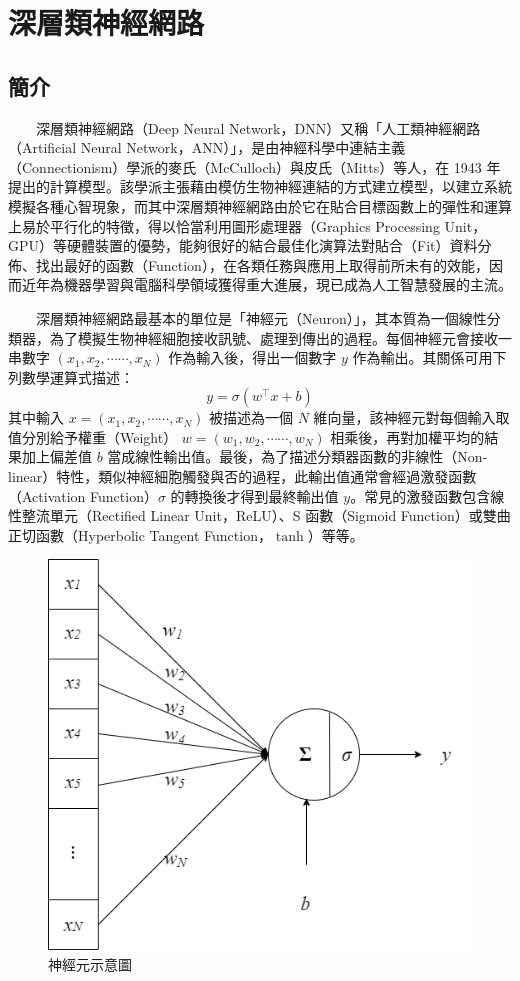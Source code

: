 \section{深層類神經網路}

\subsection{簡介}

　　深層類神經網路（Deep Neural Network，DNN）又稱「人工類神經網路（Artificial Neural Network，ANN）」，是由神經科學中連結主義（Connectionism）學派的麥氏（McCulloch）與皮氏（Mitts）等人，在 1943 年 \cite{mcculloch_logical_1943} 提出的計算模型。該學派主張藉由模仿生物神經連結的方式建立模型，以建立系統模擬各種心智現象，而其中深層類神經網路由於它在貼合目標函數上的彈性和運算上易於平行化的特徵，得以恰當利用圖形處理器（Graphics Processing Unit，GPU）等硬體裝置的優勢，能夠很好的結合最佳化演算法對貼合（Fit）資料分佈、找出最好的函數（Function），在各類任務與應用上取得前所未有的效能，因而近年為機器學習與電腦科學領域獲得重大進展，現已成為人工智慧發展的主流。

　　深層類神經網路最基本的單位是「神經元（Neuron）」，其本質為一個線性分類器，為了模擬生物神經細胞接收訊號、處理到傳出的過程。每個神經元會接收一串數字 \((x_1, x_2, \cdots\cdots, x_N)\) 作為輸入後，得出一個數字 \(y\) 作為輸出。其關係可用下列數學運算式描述：
$$y=\sigma(w^\top x + b) $$
其中輸入 $x = (x_1, x_2, \cdots\cdots, x_N)$ 被描述為一個 $N$ 維向量，該神經元對每個輸入取值分別給予權重（Weight） $w = (w_1, w_2, \cdots\cdots, w_N)$ 相乘後，再對加權平均的結果加上偏差值 $b$ 當成線性輸出值。最後，為了描述分類器函數的非線性（Non-linear）特性，類似神經細胞觸發與否的過程，此輸出值通常會經過激發函數（Activation Function）$\sigma$ 的轉換後才得到最終輸出值 $y$。常見的激發函數包含線性整流單元（Rectified Linear Unit，ReLU）、S 函數（Sigmoid Function）或雙曲正切函數（Hyperbolic Tangent Function，$\tanh$）等等。


\begin{figure}
    \centering
    \includegraphics[width=0.5\linewidth]{figures/neuron.drawio.png}
    \caption{神經元示意圖}
    \label{fig:single-neuron}
\end{figure}

